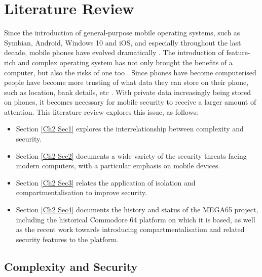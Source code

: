 
\chapter{Literature Review} %

\label{Chapter 2} %

Since the introduction of general-purpose mobile operating systems, such as Symbian, Android, Windows 10 and iOS, and especially throughout the last decade, mobile phones have evolved dramatically \cite{Reference1}.
The introduction of feature-rich and complex operating system has not only brought the benefits of a computer, but also the risks of one too \cite{Reference2}.
Since phones have become computerised people have become more trusting of what data they can store on their phone, such as location, bank details, etc \cite{Reference3}.
With private data increasingly being stored on phones, it becomes necessary for mobile security to receive a larger amount of attention.
This literature review explores this issue, as follows:
\begin{itemize}
\item{Section \ref{Ch2 Sec1} explores the interrelationship between complexity and security.}
\item{Section \ref{Ch2 Sec2} documents a wide variety of the security threats facing modern computers, with a particular emphasis on mobile devices.}
\item{Section \ref{Ch2 Sec3} relates the application of isolation and compartmentalisation to improve security.}
\item{Section \ref{Ch2 Sec4} documents the history and status of the MEGA65 project, including the historical Commodore 64 platform on which it is based, as well as the recent work towards introducing compartmentalisation and related security features to the platform.}
\end{itemize}


\section{Complexity and Security}

